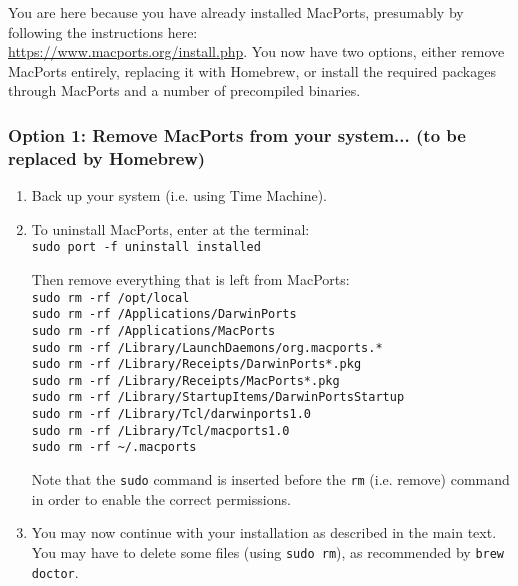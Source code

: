 \documentclass[11pt,fleqn]{book} %
\begin{document}
You are here because you have already installed MacPorts, presumably by following the instructions here:
\\\href{https://www.macports.org/install.php}{https://www.macports.org/install.php}.
You now have two options, either remove MacPorts entirely, replacing it with Homebrew, or install the required packages through MacPorts and a number of precompiled binaries.

\subsubsection*{Option 1: Remove MacPorts from your system... (to be replaced by Homebrew)}

\begin{enumerate}

\item Back up your system (i.e. using Time Machine).

\item To uninstall MacPorts, enter at the terminal:\\
\texttt{sudo port -f uninstall installed}
 
Then remove everything that is left from MacPorts: \\
\texttt{sudo rm -rf /opt/local} \\
\texttt{sudo rm -rf /Applications/DarwinPorts} \\
\texttt{sudo rm -rf /Applications/MacPorts} \\
\texttt{sudo rm -rf /Library/LaunchDaemons/org.macports.*} \\
\texttt{sudo rm -rf /Library/Receipts/DarwinPorts*.pkg}\\
\texttt{sudo rm -rf /Library/Receipts/MacPorts*.pkg} \\
\texttt{sudo rm -rf /Library/StartupItems/DarwinPortsStartup} \\
\texttt{sudo rm -rf /Library/Tcl/darwinports1.0} \\
\texttt{sudo rm -rf /Library/Tcl/macports1.0} \\
\texttt{sudo rm -rf \textasciitilde/.macports}

Note that the \texttt{sudo} command is inserted before the \texttt{rm} (i.e. remove) command in order to enable the correct permissions.

\item You may now continue with your installation as described in the main text. You may have to delete some files (using \texttt{sudo rm}), as recommended by \texttt{brew doctor}. 

\end{enumerate}
\end{document}
